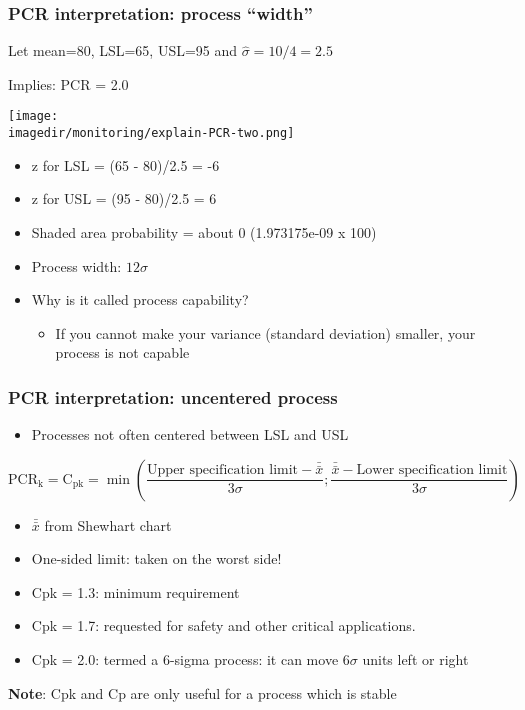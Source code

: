 \begin{frame}\frametitle{PCR interpretation: process ``width''}
	
	Let mean=80, LSL=65, USL=95 and $\hat{\sigma} = 10/4 = 2.5$
	
	Implies: PCR = 2.0
	
	\texttt{[image: \\imagedir/monitoring/explain-PCR-two.png]}
	\begin{itemize}
		\item	z for LSL = (65 - 80)/2.5 = -6 
		\item	z for USL = (95 - 80)/2.5 = 6 
		\item	Shaded area probability = about 0 (1.973175e-09 x 100) 
		\item	Process width: $12 \sigma$ 
		\item	Why is it called process capability? 
		\begin{itemize}
			\item	If you cannot make your variance (standard deviation) smaller, your process is not capable 
		\end{itemize}
	\end{itemize}
\end{frame}

\begin{frame}\frametitle{PCR interpretation: uncentered process}
	\begin{itemize}
		\item	Processes not often centered between LSL and USL 
	\end{itemize}
	
	$ \text{PCR}_\text{k} = \text{C}_\text{pk} = \min \left( \dfrac{\text{Upper specification limit} - \bar{\bar{x}}}{3\sigma}; \dfrac{\bar{\bar{x}} - \text{Lower specification limit}}{3\sigma} \right) $
	\begin{itemize}
		\item	$\bar{\bar{x}}$ from Shewhart chart 
		\item	One-sided limit: taken on the worst side! 
		\item	Cpk = 1.3: minimum requirement 
		\item	Cpk = 1.7: requested for safety and other critical applications. 
		\item	Cpk = 2.0: termed a 6-sigma process: it can move $6\sigma$ units left or right 
	\end{itemize}
	
	\textbf{Note}: Cpk and Cp are only useful for a process which is stable
\end{frame}

